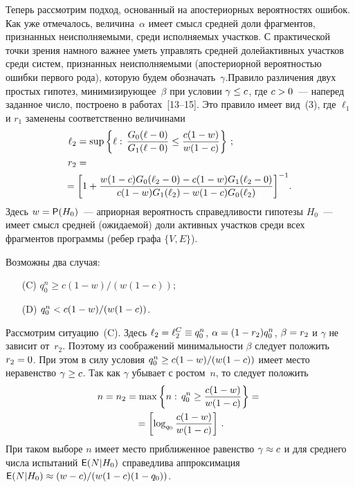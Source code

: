 \begin{multicols}{2}
Теперь рассмотрим подход, основанный на апостериорных вероятностях
ошибок. Как уже отмечалось, величина~$\alpha$ имеет смысл средней
доли фрагментов, признанных неисполняемыми, среди исполняемых
участков. С практической точки зрения намного важнее уметь управлять
средней долей\linebreak активных участков среди систем, признанных
неисполняемыми (апостериорной вероятностью ошибки первого рода),
которую будем обозначать~$\gamma$.\linebreak Правило различения двух простых
гипотез, минимизирующее~$\beta$ при условии $\gamma\hm\le c$, где $c\hm>0$~--- 
наперед заданное число, построено в работах~[13--15]. Это правило
имеет вид~(3), где $\ell_1$ и $r_1$ заменены соответственно величинами
\begin{align*}
\ell_2&=\sup\left\{\ell:\,\fr{G_0(\ell-0)}{G_1(\ell-0)}\le
\fr{c(1-w)}{w(1-c)}\right\}\,;
\\
r_2&={}\\
&\hspace*{-12.580453pt}{}=\left[1+\fr{w(1-c)G_0(\ell_2-0)-c(1-w)G_1(\ell_2-0)}{c(1-w)G_1(\ell_2)-w(1-c)G_0(\ell_2)}
\right]^{-1}\!.
\end{align*}
Здесь $w={\sf P}(H_0)$~--- априорная вероятность справедливости
гипотезы $H_0$~--- имеет смысл средней (ожидаемой) доли активных
участков среди всех фрагментов программы (ребер графа $\{V,E\}$).

Возможны два случая: 
\begin{itemize}
\item[(C)] $q_0^n\ge {c(1-w)}/(w(1-c))$;
\item[(D)] $q_0^n\hm<{c(1-w)}/(w(1-c))$.
\end{itemize}

 Рассмотрим ситуацию~(C). Здесь
$\ell_2\hm=\ell_2^C\hm\equiv q_0^n$, $\alpha\hm=(1\hm-r_2)q_0^n$, $\beta\hm=r_2$ и
$\gamma$ не зависит от~$r_2$. Поэтому из соображений минимальности
$\beta$ следует положить $r_2\hm=0$. При этом в силу условия
$q_0^n\hm\ge c(1-w)/(w(1-c))$ имеет место неравенство $\gamma\hm\ge
c$. Так как $\gamma$ убывает с ростом~$n$, то следует положить
\begin{multline*}
n=n_2=\max\left\{n:\,q_0^n\ge\displaystyle\frac{\displaystyle c(1-w)\mathstrut}{\displaystyle w(1-c)\mathstrut}\right\}={}\\
{}=
\left[\log_{q_0}\displaystyle\frac{\displaystyle c(1-w)\mathstrut}{\displaystyle w(1-c)\mathstrut}\right]\,.
\end{multline*}
При таком выборе $n$ имеет место приближенное равенство
$\gamma\hm\approx c$ и для среднего числа испытаний ${\sf E}(N|H_0)$
справедлива аппроксимация ${\sf
E}(N|H_0)\hm\approx ({w-c})/({w(1-c)(1-q_0)})$.


\end{multicols}
